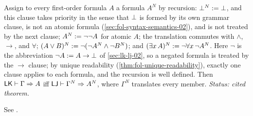 \begin{theorem}
\label{thm:negative-translation}
Assign to every first-order formula \(A\) a formula \(A^N\) by recursion:
\(\bot^N\mathrel{:=}\bot\), and this clause takes priority in the sense
that \(\bot\) is formed by its own grammar clause, is not an atomic
formula (\cref{sec:fol-syntax-semantics-02}), and is not treated by the next
clause; \(A^N\mathrel{:=}\neg\neg A\) for atomic \(A\); the translation commutes
with \(\land\), \(\to\), and
\(\forall\); \((A\lor B)^N\mathrel{:=}\neg(\neg A^N\land\neg B^N)\); and
\((\exists x\,A)^N\mathrel{:=}\neg\forall x\,\neg A^N\).  Here \(\neg\) is the
abbreviation \(\neg A\mathrel{:=} A\to\bot\) of \cref{sec:lk-lj-02}, so a
negated formula is treated by the \(\to\) clause; by unique readability
(\cref{thm:fol-unique-readability}), exactly one clause applies to each
formula, and the recursion is well defined.  Then
\(\mathsf{LK}\vdash\Gamma\Rightarrow A\) iff
\(\mathsf{LJ}\vdash\Gamma^N\Rightarrow A^N\), where \(\Gamma^N\) translates
every member.
\textit{Status: cited theorem.}
\end{theorem}

See \cite{TroelstraVanDalen1988}.

